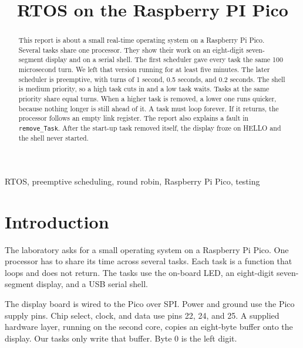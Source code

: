 \documentclass[conference,a4paper]{IEEEtran}
\begin{document}
\title{RTOS on the Raspberry PI Pico}

\author{
}

\maketitle

\begin{abstract}
This report is about a small real-time operating system on a Raspberry Pi Pico. Several tasks share one processor. They show their work on an eight-digit seven-segment display and on a serial shell. The first scheduler gave every task the same 100 microsecond turn. We left that version running for at least five minutes. The later scheduler is preemptive, with turns of 1 second, 0.5 seconds, and 0.2 seconds. The shell is medium priority, so a high task cuts in and a low task waits. Tasks at the same priority share equal turns. When a higher task is removed, a lower one runs quicker, because nothing longer is still ahead of it. A task must loop forever. If it returns, the processor follows an empty link register. The report also explains a fault in \texttt{remove\_Task}. After the start-up task removed itself, the display froze on HELLO and the shell never started.
\end{abstract}

\begin{IEEEkeywords}
RTOS, preemptive scheduling, round robin, Raspberry Pi Pico, testing
\end{IEEEkeywords}

\section{Introduction}

The laboratory asks for a small operating system on a Raspberry Pi Pico. One processor has to share its time across several tasks. Each task is a function that loops and does not return. The tasks use the on-board LED, an eight-digit seven-segment display, and a USB serial shell.

The display board is wired to the Pico over SPI. Power and ground use the Pico supply pins. Chip select, clock, and data use pins 22, 24, and 25. A supplied hardware layer, running on the second core, copies an eight-byte buffer onto the display. Our tasks only write that buffer. Byte 0 is the left digit.
\end{document}
